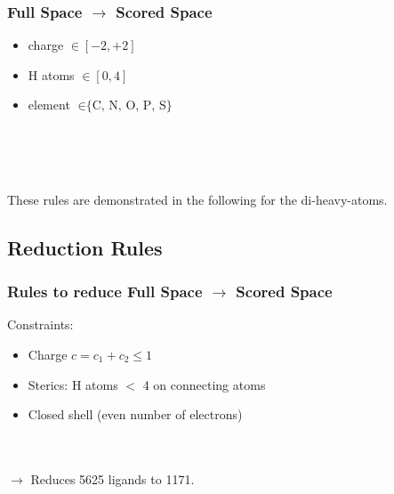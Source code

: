 \documentclass[xcolor=dvipsnames]{beamer}
\begin{document}
\begin{frame}
\frametitle{Full Space $\rightarrow$ Scored Space}
\begin{itemize}
\item charge $\in [-2,+2]$
\item H atoms $\in [0,4]$
\item element $\in \textrm{\{C,~N,~O,~P,~S\}}$
\end{itemize}
~\\
~\\
~\\
These rules are demonstrated in the following for the di-heavy-atoms.
\end{frame}

\subsection{Reduction Rules}

\begin{frame}
\frametitle{Rules to reduce Full Space $\rightarrow$ Scored Space}
Constraints:
\begin{itemize}
	\item Charge $c = c_1 + c_2 \leq 1 $
	\item Sterics: H atoms $<$ 4 on connecting atoms
	\item Closed shell (even number of electrons)
\end{itemize}
~\\
~\\
$\rightarrow$ Reduces 5625 ligands to 1171.
\end{frame}
\end{document}

